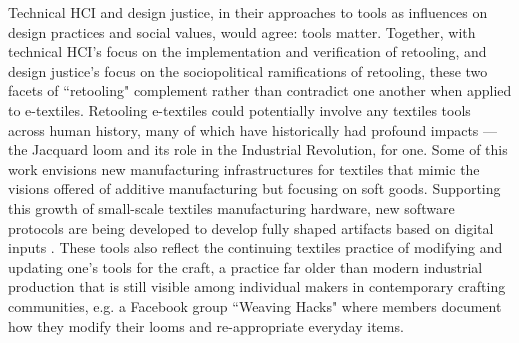 
Technical HCI and design justice, in their approaches to tools as influences on design practices and social values, would agree: tools matter. Together, with technical HCI's focus on the implementation and verification of retooling, and design justice's focus on the sociopolitical ramifications of retooling, these two facets of ``retooling" complement rather than contradict one another when applied to e-textiles. Retooling e-textiles could potentially involve any textiles tools across human history, many of which have historically had profound impacts --- the Jacquard loom and its role in the Industrial Revolution, for one. Some of this work envisions new manufacturing infrastructures for textiles that mimic the visions offered of additive manufacturing but focusing on soft goods. 
Supporting this growth of small-scale textiles manufacturing hardware, new software protocols are being developed to develop fully shaped artifacts based on digital inputs \todo{[5,92]}. These tools also reflect the continuing textiles practice of modifying and updating one's tools for the craft, a practice far older than modern industrial production that is still visible among individual makers in contemporary crafting communities, e.g. a Facebook group ``Weaving Hacks" \todo{[46]} where members document how they modify their looms and re-appropriate everyday items.

